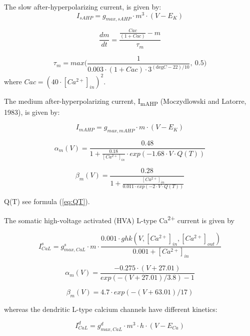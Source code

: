 \documentclass[a4paper,12pt]{article}
\begin{document}
The slow after-hyperpolarizing current, is given by:
\begin{equation}
I_{sAHP}= g_{max, sAHP} \cdot m^3 \cdot (V-E_K)
\end{equation}

\begin{equation}
\frac{dm}{dt}=\frac{\frac{Cac}{(1+Cac)}-m}{\tau_m}
\end{equation}

\begin{equation}
\tau_m=max \Big(\frac {1}{0.003 \cdot (1+Cac)\cdot 3^{(\text{deg}C-22)/10}}, \ 0.5 \Big)
\end{equation}
where 
$Cac=(40 \cdot [Ca^{2+}]_{in})^2$.

The medium after-hyperpolarizing current, I\textsubscript{mAHP} (Moczydlowski and Latorre, 1983), is given by:

\begin{equation}
I_{mAHP}= g_{max, mAHP}\cdot m\cdot (V-E_K)
\end{equation}

\begin{equation}
\alpha_m(V)=\frac{0.48}{1+\frac{0.18}{[Ca^{2+}]_{in}}\cdot exp(-1.68\cdot V\cdot Q(T))}
\end{equation}

\begin{equation}
\beta_m(V)=\frac{0.28}{1+\frac{[Ca^{2+}]_{in}}{0.011\cdot exp(-2\cdot V\cdot Q(T))}}
\end{equation}

Q(T) see formula (\ref{eq:QT}). \par
The somatic high-voltage activated (HVA) L-type Ca\textsuperscript{2+} current is given by


\begin{equation}
I_{CaL}^s= g_{max, CaL}^s\cdot m\cdot \frac{0.001 \cdot ghk(V, [Ca^{2+}]_{in}, [Ca^{2+}]_{out}) }{0.001 + [Ca^{2+}]_{in}}
\end{equation}

\begin{equation}
\alpha_m(V)= \frac{-0.275 \cdot (V+27.01)}{exp(-(V+27.01)/3.8)-1}
\end{equation}

\begin{equation}
 \beta_m(V)= 4.7 \cdot exp(-(V+63.01)/17)
\end{equation}


whereas the dendritic L-type calcium channels have different kinetics: 


\begin{equation}
I_{CaL}^d= g_{max, CaL}^d \cdot m^3 \cdot h \cdot
(V-E_{Ca})
\end{equation}
\end{document}
